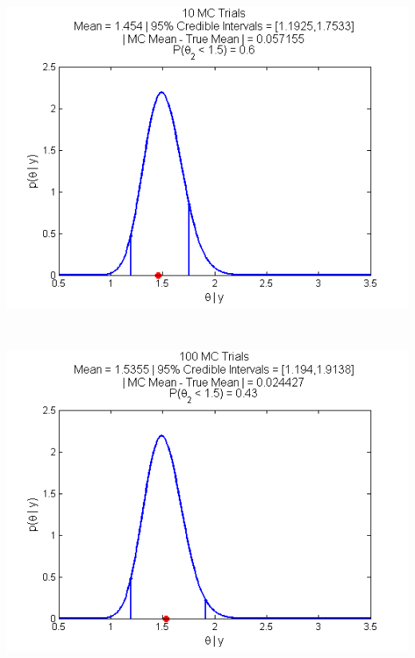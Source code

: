 \documentclass{article}
\begin{document}
\\
\begin{center}
\includegraphics[scale=0.75]{MCTrials_10.png}
\end{center}

\\
\begin{center}
\includegraphics[scale=0.75]{MCTrials_100.png}
\end{center}

\pagebreak
\end{document}
